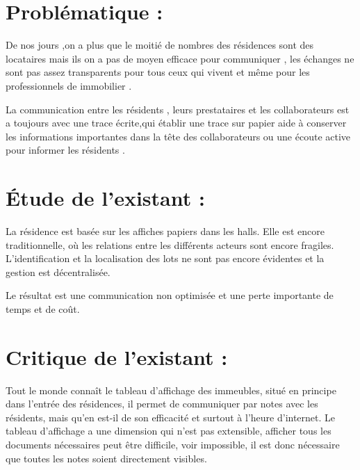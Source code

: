 \documentclass[a4paper,10pt]{book}
\begin{document}
\section {Problématique : }
\par  De nos jours ,on a plus que le moitié de nombres des résidences sont des locataires mais ils on a pas de moyen efficace pour communiquer , les échanges ne sont pas assez transparents pour tous ceux qui vivent et même pour les professionnels de immobilier .

\par La communication entre les résidents , leurs prestataires et les collaborateurs est a toujours avec une trace écrite,qui établir une trace sur papier aide à conserver les informations importantes dans la tête des collaborateurs ou une écoute active pour informer les résidents .


\section{Étude de l’existant : }
\par
    La résidence est basée sur les affiches papiers dans les halls. Elle est encore traditionnelle, où les relations entre les différents acteurs sont encore fragiles. L’identification et la localisation des lots ne sont pas encore évidentes et la gestion est décentralisée. 

    Le résultat est une communication non optimisée  et une perte importante de temps et de coût. 

\section{Critique de l’existant :}
Tout le monde connaît le tableau d'affichage des immeubles, situé en principe dans l'entrée des résidences, il permet de communiquer par notes avec les résidents, mais qu'en est-il de son efficacité et surtout à l'heure d'internet.
 Le tableau d'affichage a une dimension qui n'est pas extensible, afficher tous les documents nécessaires peut être difficile, voir impossible, il est donc nécessaire que toutes les notes soient directement visibles. 
 
\end{document}
